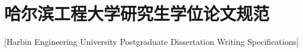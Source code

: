 
\chapter[哈尔滨工程大学研究生学位论文规范]{哈尔滨工程大学研究生学位论文规范}[Harbin Engineering University Postgraduate Dissertation Writing Specifications]
